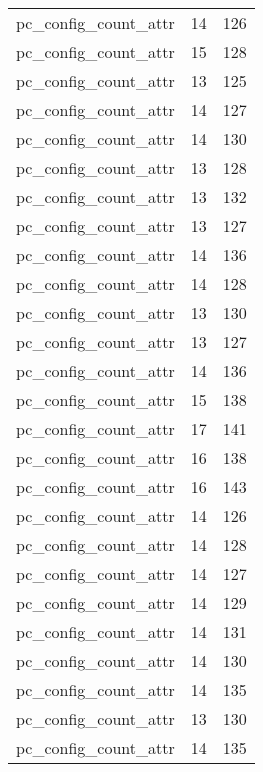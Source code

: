 \begin{table}
\begin{tabular}{lrr}
            pc\_config\_count\_attr &        14 &       126 \\
            pc\_config\_count\_attr &        15 &       128 \\
            pc\_config\_count\_attr &        13 &       125 \\
            pc\_config\_count\_attr &        14 &       127 \\
            pc\_config\_count\_attr &        14 &       130 \\
            pc\_config\_count\_attr &        13 &       128 \\
            pc\_config\_count\_attr &        13 &       132 \\
            pc\_config\_count\_attr &        13 &       127 \\
            pc\_config\_count\_attr &        14 &       136 \\
            pc\_config\_count\_attr &        14 &       128 \\
            pc\_config\_count\_attr &        13 &       130 \\
            pc\_config\_count\_attr &        13 &       127 \\
            pc\_config\_count\_attr &        14 &       136 \\
            pc\_config\_count\_attr &        15 &       138 \\
            pc\_config\_count\_attr &        17 &       141 \\
            pc\_config\_count\_attr &        16 &       138 \\
            pc\_config\_count\_attr &        16 &       143 \\
            pc\_config\_count\_attr &        14 &       126 \\
            pc\_config\_count\_attr &        14 &       128 \\
            pc\_config\_count\_attr &        14 &       127 \\
            pc\_config\_count\_attr &        14 &       129 \\
            pc\_config\_count\_attr &        14 &       131 \\
            pc\_config\_count\_attr &        14 &       130 \\
            pc\_config\_count\_attr &        14 &       135 \\
            pc\_config\_count\_attr &        13 &       130 \\
            pc\_config\_count\_attr &        14 &       135 \\

\end{tabular}
\end{table}
